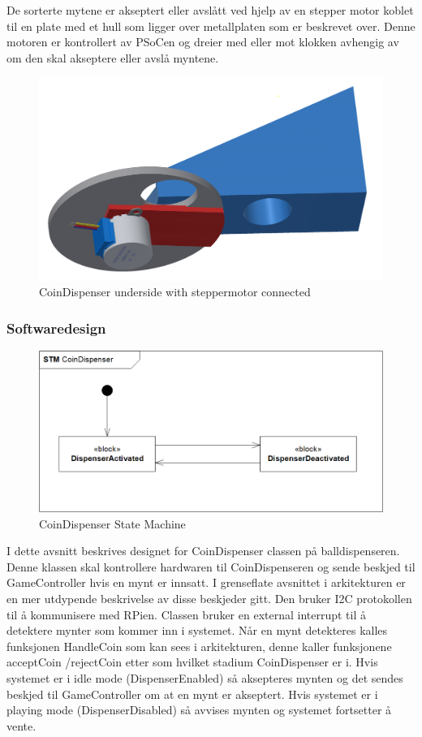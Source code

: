\documentclass[Rapport/Rapport_main.tex]{subfiles}
\begin{document}
De sorterte mytene er akseptert eller avslått ved hjelp av en stepper motor koblet til en plate med et hull som ligger over metallplaten som er beskrevet over. Denne motoren er kontrollert av PSoCen og dreier med eller mot klokken avhengig av om den skal akseptere eller avslå myntene.

\begin{figure}[H]
    \centering
    \includegraphics[width=1\textwidth]{Rapport/BallDispenser/CoinDispenser/graphics/coinmaster-under.png}
    \caption{CoinDispenser underside with steppermotor connected}
    \label{fig:my_label}
\end{figure}

\subsubsection{Softwaredesign}
\begin{figure}[H]
    \centering
    \includegraphics[width=1\textwidth]{Rapport/BallDispenser/CoinDispenser/graphics/CoinSTM.png}
    \caption{CoinDispenser State Machine}
    \label{fig:CoinSTM}
\end{figure}
I dette avsnitt beskrives designet for CoinDispenser classen på balldispenseren. Denne klassen skal kontrollere hardwaren til CoinDispenseren og sende beskjed til GameController hvis en mynt er innsatt. I grenseflate avsnittet i arkitekturen er en mer utdypende beskrivelse av disse beskjeder gitt. Den bruker I2C protokollen til å kommunisere med RPien. Classen bruker en external interrupt til å detektere mynter som kommer inn i systemet. Når en mynt detekteres kalles funksjonen HandleCoin som kan sees i arkitekturen, denne kaller funksjonene acceptCoin /rejectCoin etter som hvilket stadium CoinDispenser er i. Hvis systemet er i idle mode (DispenserEnabled) så aksepteres mynten og det sendes beskjed til GameController om at en mynt er akseptert. Hvis systemet er i playing mode (DispenserDisabled) så avvises mynten og systemet fortsetter å vente.
\end{document}
